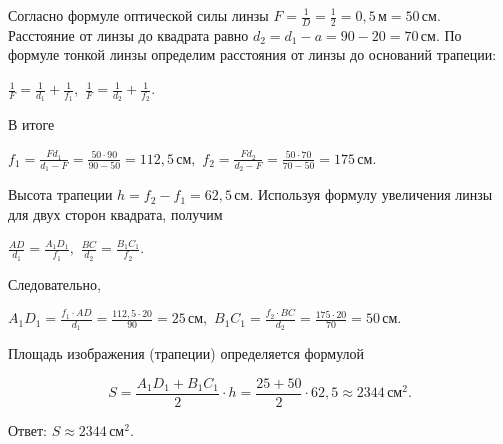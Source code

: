 \documentclass[12pt,a4paper]{article}
\begin{document}
{Согласно формуле оптической силы линзы $F = \frac{1}{D} = \frac{1}{2} = 0{,}5 \,\text{м} = 50 \,\text{см}.$ Расстояние от линзы до квадрата равно $d_2 = d_1 - a = 90 - 20 = 70 \,\text{см}.$ По формуле тонкой линзы определим расстояния от линзы до оснований трапеции:

$\frac{1}{F} = \frac{1}{d_1} + \frac{1}{f_1} ,$
$\frac{1}{F} = \frac{1}{d_2} + \frac{1}{f_2} .$

 В итоге

$f_1 = \frac{Fd_1}{d_1 - F} = \frac{50 \cdot 90}{90 - 50} = 112{,}5 \,\text{см},$
$f_2 = \frac{Fd_2}{d_2 - F} = \frac{50 \cdot 70}{70 - 50} = 175 \,\text{см}.$

 Высота трапеции $h = f_2 - f_1 = 62{,}5 \,\text{см}.$
Используя формулу увеличения линзы для двух сторон квадрата, получим

$\frac{AD}{d_1} = \frac{A_1D_1}{f_1} ,$
$\frac{BC}{d_2} = \frac{B_1C_1}{f_2} .$

 Следовательно,

$A_1D_1 = \frac{f_1 \cdot AD}{d_1} = \frac{112{,}5 \cdot 20}{90} = 25 \,\text{см},$
$B_1C_1 = \frac{f_2 \cdot BC}{d_2} = \frac{175 \cdot 20}{70} = 50 \,\text{см}.$

Площадь изображения (трапеции) определяется формулой

\[S = \frac{A_1D_1 + B_1C_1}{2} \cdot h = \frac{25 + 50}{2} \cdot 62{,}5 \approx 2344 \,\text{см} ^2 .\]

Ответ: $S \approx 2344 \,\text{см} ^2 .$
}
\end{document}
